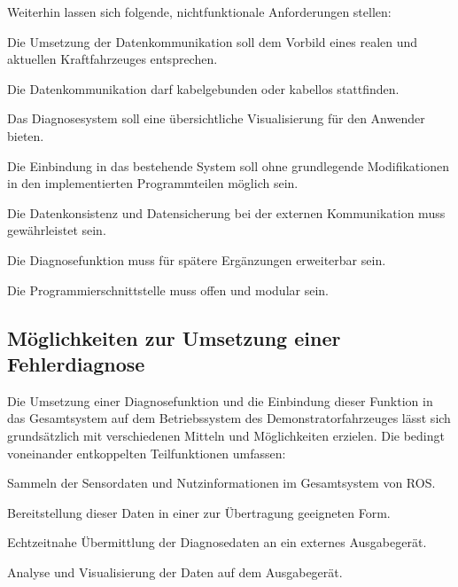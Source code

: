 Weiterhin lassen sich folgende, nichtfunktionale Anforderungen stellen:
\begin{compactitem}
	\item Die Umsetzung der Datenkommunikation soll dem Vorbild eines realen und aktuellen Kraftfahrzeuges entsprechen.
	\item Die Datenkommunikation darf kabelgebunden oder kabellos stattfinden.
	
	\item Das Diagnosesystem soll eine übersichtliche Visualisierung für den Anwender bieten. 
	\item Die Einbindung in das bestehende System soll ohne grundlegende Modifikationen in den implementierten Programmteilen möglich sein.
	\item Die Datenkonsistenz und Datensicherung bei der externen Kommunikation muss gewährleistet sein.
	\item Die Diagnosefunktion muss für spätere Ergänzungen erweiterbar sein.
	\item Die Programmierschnittstelle muss offen und modular sein. 
\end{compactitem}


\subsection{Möglichkeiten zur Umsetzung einer Fehlerdiagnose}
\label{subsec:MöglichkeitenDiagnose}

Die Umsetzung einer Diagnosefunktion und die Einbindung dieser Funktion in das Gesamtsystem auf dem Betriebssystem des Demonstratorfahrzeuges lässt sich grundsätzlich mit verschiedenen Mitteln und Möglichkeiten erzielen. Die bedingt voneinander entkoppelten Teilfunktionen umfassen:
\begin{compactitem}
	\item Sammeln der Sensordaten und Nutzinformationen im Gesamtsystem von ROS.
	\item Bereitstellung dieser Daten in einer zur Übertragung geeigneten Form.
	\item Echtzeitnahe Übermittlung der Diagnosedaten an ein externes Ausgabegerät.
	\item Analyse und Visualisierung der Daten auf dem Ausgabegerät. 
\end{compactitem}

